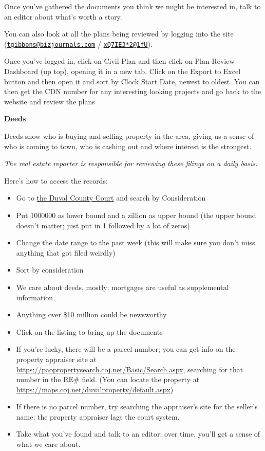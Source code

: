 \documentclass[
  11pt,
  american,
  letterpaperpaper,
  extrafontsizes,onecolumn,openright
  ]{memoir}
\providecommand{\tightlist}{%
  \setlength{\itemsep}{0pt}\setlength{\parskip}{0pt}}
\begin{document}
Once you've gathered the documents you think we might be interested in, talk to an editor about what's worth a story.

You can also look at all the plans being reviewed by logging into the site (\href{mailto:tgibbons@bizjournals.com}{\nolinkurl{tgibbons@bizjournals.com}} / \href{mailto:xQ7IE3*2@1fU}{\nolinkurl{xQ7IE3*2@1fU}}).

Once you've logged in, click on Civil Plan and then click on Plan Review Dashboard (up top), opening it in a new tab. Click on the Export to Excel button and then open it and sort by Clock Start Date, newest to oldest. You can then get the CDN number for any interesting looking projects and go back to the website and review the plans

\textbf{Deeds}

Deeds show who is buying and selling property in the area, giving us a sense of who is coming to town, who is cashing out and where interest is the strongest.

\emph{The real estate reporter is responsible for reviewing these filings on a daily basis.}

Here's how to access the records:

\begin{itemize}
\tightlist
\item
  Go to \href{https://oncore.duvalclerk.com/search/Disclaimer?st=/search/SearchTypeConsideration}{the Duval County Court} and search by Consideration
\item
  Put 1000000 as lower bound and a zillion as upper bound (the upper bound doesn't matter; just put in 1 followed by a lot of zeros)
\item
  Change the date range to the past week (this will make sure you don't miss anything that got filed weirdly)
\item
  Sort by consideration
\item
  We care about deeds, mostly; mortgages are useful as supplemental information
\item
  Anything over \$10 million could be newsworthy
\item
  Click on the listing to bring up the documents
\item
  If you're lucky, there will be a parcel number; you can get info on the property appraiser site at \url{https://paopropertysearch.coj.net/Basic/Search.aspx}, searching for that number in the RE\# field. (You can locate the property at \url{https://maps.coj.net/duvalproperty/default.aspx})
\item
  If there is no parcel number, try searching the appraiser's site for the seller's name; the property appraiser lags the court system.
\item
  Take what you've found and talk to an editor; over time, you'll get a sense of what we care about.
\end{itemize}
\end{document}
